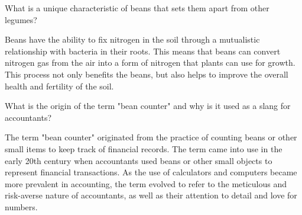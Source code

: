 \question[10] What is a unique characteristic of beans that sets them apart from other legumes?
\begin{solution}
Beans have the ability to fix nitrogen in the soil through a mutualistic relationship with bacteria in their roots. This means that beans can convert nitrogen gas from the air into a form of nitrogen that plants can use for growth. This process not only benefits the beans, but also helps to improve the overall health and fertility of the soil.
\end{solution}

\question[15] What is the origin of the term "bean counter" and why is it used as a slang for accountants?
\begin{solution}
The term "bean counter" originated from the practice of counting beans or other small items to keep track of financial records. The term came into use in the early 20th century when accountants used beans or other small objects to represent financial transactions. As the use of calculators and computers became more prevalent in accounting, the term evolved to refer to the meticulous and risk-averse nature of accountants, as well as their attention to detail and love for numbers.
\end{solution}

